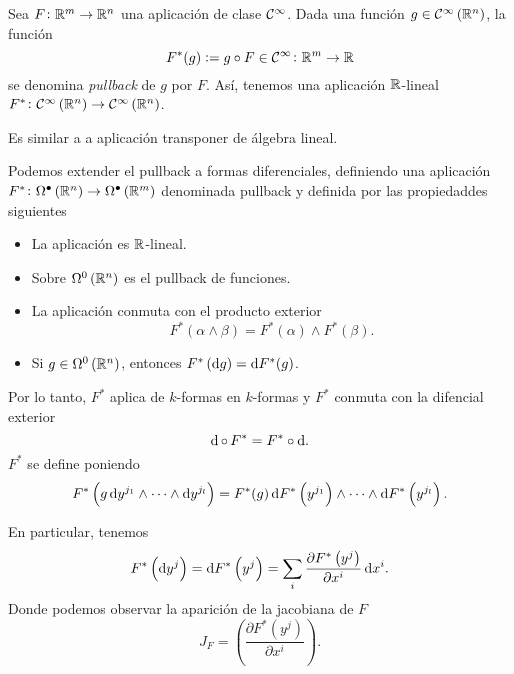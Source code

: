 \begin{defi}
    Sea $F \colon \mathbb{R}^m \to \mathbb{R}^n$ una aplicación de clase $\mathcal{C}^\infty$. Dada una función $g \in \mathcal{C}^\infty\left( \mathbb{R}^n \right)$, la función
    \[
        F^\ast(g) := g \circ F \in \mathcal{C}^\infty \colon \mathbb{R}^m \to \mathbb{R}
    \]
    se denomina \emph{pullback} de $g$ por $F$. Así, tenemos una aplicación $\mathbb{R}$-lineal $F^\ast \colon \mathcal{C}^\infty \left( \mathbb{R}^n \right)
    \to \mathcal{C}^\infty \left( \mathbb{R}^n \right)$.
\end{defi}
\begin{obs*}
    Es similar a a aplicación transponer de álgebra lineal.
\end{obs*}

\begin{defi}
    Podemos extender el pullback a formas diferenciales, definiendo una aplicación $F^\ast \colon \Omega^\bullet \left( \mathbb{R}^n \right) \to
    \Omega^\bullet\left( \mathbb{R}^m \right)$ denominada pullback y definida por las propiedaddes siguientes
    \begin{itemize}
        \item La aplicación es $\mathbb{R}$-lineal.
        \item Sobre $\Omega^0\left( \mathbb{R}^n \right)$ es el pullback de funciones.
        \item La aplicación conmuta con el producto exterior
            \[
                F^\ast(\alpha \wedge \beta) = F^\ast(\alpha) \wedge F^\ast(\beta).
            \]
        \item Si $g \in \Omega^0 \left( \mathbb{R}^n \right)$, entonces $F^\ast\left( \dif g \right) = \dif F^\ast(g)$.
    \end{itemize}
    Por lo tanto, $F^\ast$ aplica de $k$-formas en $k$-formas y $F^\ast$ conmuta con la difencial exterior
    \[
        \dif\, \circ\, F^\ast = F^\ast \circ \dif.
    \]
    $F^\ast$ se define poniendo
    \[
        F^\ast\left( g \dif y^{j_1} \wedge \cdots \wedge \dif y^{j_l} \right) = F^\ast(g)\dif F^\ast\left( y^{j_1} \right) \wedge
        \cdots \wedge \dif F^\ast\left( y^{j_l} \right).
    \]
\end{defi}

\begin{obs}
    En particular, tenemos
    \[
        F^\ast \left( \dif y^j \right) = \dif F^\ast\left( y^j \right) =
        \sum_i \frac{\partial F^\ast\left( y^j \right)}{\partial x^i} \dif x^i.
    \]
    Donde podemos observar la aparición de la jacobiana de $F$
    \[
        J_F = \left( \frac{\partial F^\ast \left( y^j \right)}{\partial x^i} \right).
    \]
\end{obs}

